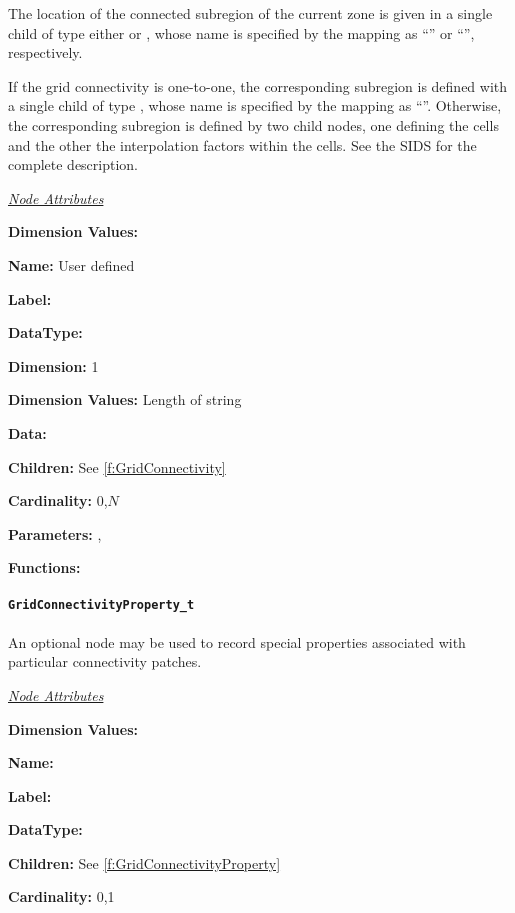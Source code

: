 The location of the connected subregion of the current zone is
given in a single child of type either  or
, whose name is specified by the mapping as
``'' or ``'', respectively.

If the grid connectivity is one-to-one, the corresponding subregion is
defined with a single child of type , whose name is
specified by the mapping as ``''.  Otherwise, the
corresponding subregion is defined by two child nodes, one defining the
cells and the other the interpolation factors within the cells.
See the SIDS for the complete description.

\textit{\uline{Node Attributes}}
\begin{Ventryic}{\textbf{Dimension Values:}}
\item [\textbf{Name:}]
      User defined
\item [\textbf{Label:}]
\item [\textbf{DataType:}]
\item [\textbf{Dimension:}]
      1
\item [\textbf{Dimension Values:}]
      Length of string
\item [\textbf{Data:}]
\item [\textbf{Children:}]
      See \autoref{f:GridConnectivity}
\item [\textbf{Cardinality:}]
      0,$N$
\item [\textbf{Parameters:}]
      , 
\item [\textbf{Functions:}]
\end{Ventryic}

\paragraph{\texttt{GridConnectivityProperty\_t}}

An optional  node may be used to
record special properties associated with particular connectivity
patches.

\textit{\uline{Node Attributes}}
\begin{Ventryic}{\textbf{Dimension Values:}}
\item [\textbf{Name:}]
\item [\textbf{Label:}]
\item [\textbf{DataType:}]
\item [\textbf{Children:}]
      See \autoref{f:GridConnectivityProperty}
\item [\textbf{Cardinality:}]
      0,1
\end{Ventryic}

